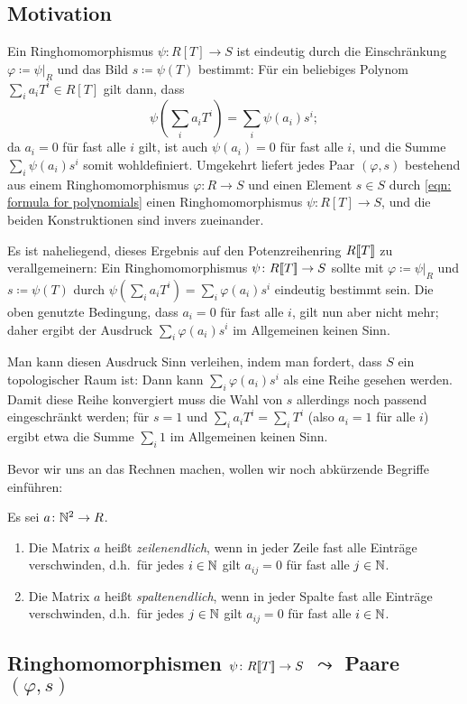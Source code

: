 \documentclass[a4paper, 10pt, numbers=noenddot]{scrartcl}
\begin{document}
\subsection*{Motivation}

Ein Ringhomomorphismus $\psi \colon R[T] \to S$ ist eindeutig durch die Einschränkung $\varphi \coloneqq \psi|_R$ und das Bild $s \coloneqq \psi(T)$ bestimmt:
Für ein beliebiges Polynom $\sum_i a_i T^i \in R[T]$ gilt dann, dass
\begin{equation}
  \label{eqn: formula for polynomials}
    \psi\left( \sum_i a_i T^i \right)
  = \sum_i \psi(a_i) s^i;
\end{equation}
da $a_i = 0$ für fast alle $i$ gilt, ist auch $\psi(a_i) = 0$ für fast alle $i$, und die Summe $\sum_i \psi(a_i) s^i$ somit wohldefiniert.
Umgekehrt liefert jedes Paar $(\varphi, s)$ bestehend aus einem Ringhomomorphismus $\varphi \colon R \to S$ und einen Element $s \in S$ durch \eqref{eqn: formula for polynomials} einen Ringhomomorphismus $\psi \colon R[T] \to S$, und die beiden Konstruktionen sind invers zueinander.

Es ist naheliegend, dieses Ergebnis auf den Potenzreihenring $R[\![T]\!]$ zu verallgemeinern:
Ein Ringhomomorphismus $\psi \colon R[\![T]\!] \to S$ sollte mit $\varphi \coloneqq \psi|_R$ und $s \coloneqq \psi(T)$ durch $\psi(\sum_i a_i T^i) = \sum_i \varphi(a_i) s^i$ eindeutig bestimmt sein.
Die oben genutzte Bedingung, dass $a_i = 0$ für fast alle $i$, gilt nun aber nicht mehr; daher ergibt der Ausdruck $\sum_i \varphi(a_i) s^i$ im Allgemeinen keinen Sinn.

Man kann diesen Ausdruck Sinn verleihen, indem man fordert, dass $S$ ein topologischer Raum ist:  
Dann kann $\sum_i \varphi(a_i) s^i$ als eine Reihe gesehen werden.
Damit diese Reihe konvergiert muss die Wahl von $s$ allerdings noch passend eingeschränkt werden;
für $s = 1$ und $\sum_i a_i T^i = \sum_i T^i$ (also $a_i = 1$ für alle $i$) ergibt etwa die Summe $\sum_i 1$ im Allgemeinen keinen Sinn.

Bevor wir uns an das Rechnen machen, wollen wir noch abkürzende Begriffe einführen:

\begin{definition}
  Es sei $a \colon \mathbb{N}^2 \to R$.
  \begin{enumerate}
    \item
      Die Matrix $a$ heißt \emph{zeilenendlich}, wenn in jeder Zeile fast alle Einträge verschwinden, d.h.\ für jedes $i \in \mathbb{N}$ gilt $a_{ij} = 0$ für fast alle $j \in \mathbb{N}$.
    \item
      Die Matrix $a$ heißt \emph{spaltenendlich}, wenn in jeder Spalte fast alle Einträge verschwinden, d.h.\ für jedes $j \in \mathbb{N}$ gilt $a_{ij} = 0$ für fast alle $i \in \mathbb{N}$.
  \end{enumerate}
\end{definition}



\subsection*{Ringhomomorphismen $\psi \colon R[\![T]\!] \to S$ $\leadsto$ Paare $(\varphi, s)$}
\end{document}
